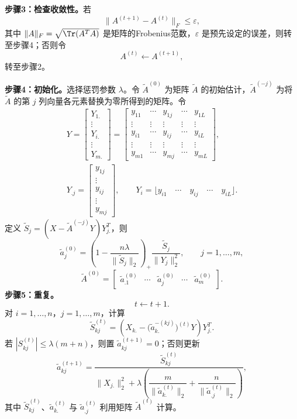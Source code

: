 \noindent\textbf{步骤3：检查收敛性。}若
\[
\lVert A^{(t+1)}-A^{(t)}\rVert_F\le\varepsilon,
\]
其中 $\lVert A\rVert_F=\sqrt{\Tr(A^TA)}$ 是矩阵的Frobenius范数，$\varepsilon$ 是预先设定的误差，则转至步骤4；否则令
\[
A^{(t)}\leftarrow A^{(t+1)},
\]
转至步骤2。

\noindent\textbf{步骤4：初始化。}选择惩罚参数 $\lambda$。令 $\widetilde A^{(0)}$ 为矩阵 $\widetilde A$ 的初始估计，$\widetilde A^{(-j)}$ 为将 $\widetilde A$ 的第 $j$ 列向量各元素替换为零所得到的矩阵。令
\[
\begin{gathered}
Y=\begin{bmatrix}Y_{1.}\\\vdots\\Y_{i.}\\\vdots\\Y_{m.}\end{bmatrix}
=\begin{bmatrix}y_{11}&\cdots&y_{1j}&\cdots&y_{1L}\\\vdots&\vdots&\vdots&\vdots&\vdots\\y_{i1}&\cdots&y_{ij}&\cdots&y_{iL}\\\vdots&\vdots&\vdots&\vdots&\vdots\\y_{m1}&\cdots&y_{mj}&\cdots&y_{mL}\end{bmatrix},\\
Y_{.j}=\begin{bmatrix}y_{1j}\\\vdots\\y_{ij}\\\vdots\\y_{mj}\end{bmatrix},\qquad
Y_i=\lfloor y_{i1}\quad\cdots\quad y_{ij}\quad\cdots\quad y_{iL}\rfloor.
\end{gathered}
\]
定义 $\widetilde S_j=(X-\widetilde A^{(-j)}Y)Y_{j.}^T$，则
\begin{equation}
\widetilde a_j^{(0)}=\left(1-\frac{n\lambda}{\lVert\widetilde S_j\rVert_2}\right)_+
\frac{\widetilde S_j}{\lVert Y_j\rVert_2^2},\qquad j=1,\ldots,m,
\tag{7.165}
\end{equation}
\[
\widetilde A^{(0)}=\begin{bmatrix}\widetilde a_{.1}^{(0)}&\cdots&\widetilde a_j^{(0)}&\cdots&\widetilde a_m^{(0)}\end{bmatrix}.
\]
\noindent\textbf{步骤5：重复。}
\[
t\leftarrow t+1.
\]
对 $i=1,\ldots,n$，$j=1,\ldots,m$，计算
\begin{equation}
\widetilde S_{kj}^{(t)}=\left(X_{k.}-\bigl(\widetilde a_{k.}^{-(kj)}\bigr)^{(t)}Y\right)Y_{j.}^T.
\tag{7.166}
\end{equation}
若 $|S_{kj}^{(t)}|\le\lambda(m+n)$，则置 $\widetilde a_{kj}^{(t+1)}=0$；否则更新
\begin{equation}
\widetilde a_{kj}^{(t+1)}=\frac{\widetilde S_{kj}^{(t)}}{\lVert X_{j.}\rVert_2^2+
\lambda\left(\dfrac m{\lVert\widetilde a_{k.}^{(t)}\rVert_2}+\dfrac n{\lVert\widetilde a_{.j}^{(t)}\rVert_2}\right)},
\tag{7.167}
\end{equation}
其中 $\widetilde S_{kj}^{(t)}$、$\widetilde a_{k.}^{(t)}$ 与 $\widetilde a_{.j}^{(t)}$ 利用矩阵 $\widetilde A^{(t)}$ 计算。

